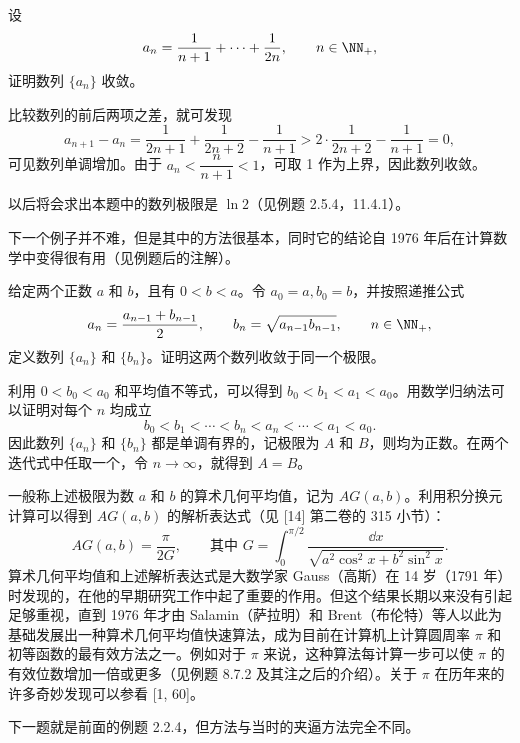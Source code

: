 \begin{xexample}[2.3.4]
设
\[
  a_n=\frac1{n+1}+\cdots+\frac1{2n},\qquad n\in\NN_+,
\]
证明数列 $\{a_n\}$ 收敛。
\end{xexample}
\begin{xproof}
比较数列的前后两项之差，就可发现
\[
  a_{n+1}-a_n=\frac1{2n+1}+\frac1{2n+2}-\frac1{n+1}
  >2\cdot\frac1{2n+2}-\frac1{n+1}=0,
\]
可见数列单调增加。由于 $a_n<\dfrac n{n+1}<1$，可取 1 作为上界，因此数列收敛。
\end{xproof}

\begin{xremark}
以后将会求出本题中的数列极限是 $\ln2$（见例题 2.5.4，11.4.1）。
\end{xremark}

下一个例子并不难，但是其中的方法很基本，同时它的结论自 1976 年后在计算数学中变得很有用（见例题后的注解）。

\begin{xexample}[2.3.5]
给定两个正数 $a$ 和 $b$，且有 $0<b<a$。令 $a_0=a,b_0=b$，并按照递推公式
\[
  a_n=\frac{a_{n-1}+b_{n-1}}2,
  \qquad
  b_n=\sqrt{a_{n-1}b_{n-1}},
  \qquad n\in\NN_+,
\]
定义数列 $\{a_n\}$ 和 $\{b_n\}$。证明这两个数列收敛于同一个极限。
\end{xexample}
\begin{xproof}
利用 $0<b_0<a_0$ 和平均值不等式，可以得到 $b_0<b_1<a_1<a_0$。用数学归纳法可以证明对每个 $n$ 均成立
\[
  b_0<b_1<\cdots<b_n<a_n<\cdots<a_1<a_0.
\]
因此数列 $\{a_n\}$ 和 $\{b_n\}$ 都是单调有界的，记极限为 $A$ 和 $B$，则均为正数。在两个迭代式中任取一个，令 $n\to\infty$，就得到 $A=B$。
\end{xproof}

\begin{xremark}
一般称上述极限为数 $a$ 和 $b$ 的算术几何平均值，记为 $AG(a,b)$。利用积分换元计算可以得到 $AG(a,b)$ 的解析表达式（见 [14] 第二卷的 315 小节）：
\[
  AG(a,b)=\frac{\pi}{2G},\qquad
  \text{其中 }G=\int_0^{\pi/2}\frac{\dd x}{\sqrt{a^2\cos^2x+b^2\sin^2x}}.
\]
算术几何平均值和上述解析表达式是大数学家 Gauss（高斯）在 14 岁（1791 年）时发现的，在他的早期研究工作中起了重要的作用。但这个结果长期以来没有引起足够重视，直到 1976 年才由 Salamin（萨拉明）和 Brent（布伦特）等人以此为基础发展出一种算术几何平均值快速算法，成为目前在计算机上计算圆周率 $\pi$ 和初等函数的最有效方法之一。例如对于 $\pi$ 来说，这种算法每计算一步可以使 $\pi$ 的有效位数增加一倍或更多（见例题 8.7.2 及其注之后的介绍）。关于 $\pi$ 在历年来的许多奇妙发现可以参看 [1, 60]。
\end{xremark}

下一题就是前面的例题 2.2.4，但方法与当时的夹逼方法完全不同。

